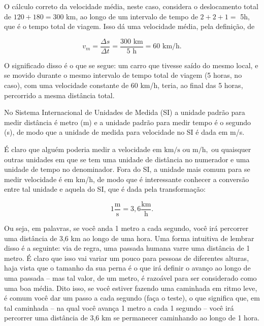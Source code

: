 \begin{itemize}
O cálculo correto da velocidade média, neste caso, considera o deslocamento total de $120+180 = 300 $ km, ao longo de um intervalo de tempo de $2+2+1 = $ 5h, que é o tempo total de viagem. Isso dá uma velocidade média, pela definição, de 

        $$ v_m = \dfrac{\Delta s}{\Delta t} = \dfrac{300 \text{ km}}{5 \text{ h}} = 60 \text{ km/h}.$$


        O significado disso é o que se segue: um carro que tivesse saído do mesmo local, e se movido durante o mesmo intervalo de tempo total de viagem (5 horas, no caso), com uma velocidade constante de $60$ km/h, teria, ao final das 5 horas, percorrido a mesma distância total.
    
    
\end{itemize}








No Sistema Internacional de Unidades de Medida (SI) a unidade padrão para medir distância é metro (m) e a unidade padrão para medir tempo é o segundo (s), de modo que a unidade de medida para velocidade no SI é dada em m/s.

É claro que alguém poderia medir a velocidade em $\text{km}/\text{s}$ ou  $\text{m}/\text{h},$ ou quaisquer outras unidades em que se tem uma unidade de distância no numerador e uma unidade de tempo no denominador. Fora do SI, a unidade mais comum para se medir velocidade é em km/h, de modo que é interessante conhecer a conversão entre tal unidade e aquela do SI, que é dada pela transformação:

\begin{equation}
    \boxed{1 \dfrac{ \text{m}}{\text{s}} = 3,6 \dfrac{\text{km}}{\text{h}}.}
      \label{mecanica_eq_convertermsparakmh}
\end{equation}

Ou seja, em palavras, se você anda 1 metro a cada segundo, você irá percorrer uma distância de 3,6 km ao longo de uma hora. Uma forma intuitiva de lembrar disso é a seguinte: via de regra, uma passada humana varre uma distância de 1 metro. É claro que isso vai variar um pouco para pessoas de diferentes alturas, haja vista que o tamanho da sua perna é o que irá definir o avanço ao longo de uma passada -- mas tal valor, de um metro, é razoável para ser considerado como uma boa média. Dito isso, se você estiver fazendo uma caminhada em ritmo leve, é comum você dar um passo a cada segundo (faça o teste), o que significa que, em tal caminhada -- na qual você avança 1 metro a cada 1 segundo -- você irá percorrer uma distância de 3,6 km se permanecer caminhando ao longo de 1 hora. 


